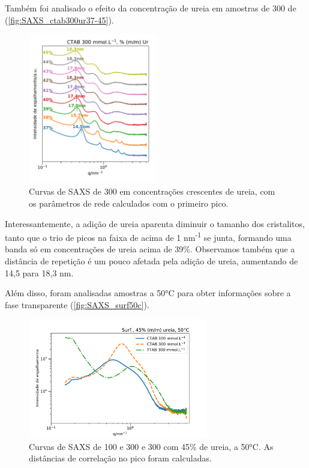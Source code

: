 	
	Também foi analisado o efeito da concentração de ureia em amostras de 300 \mM{} de \CTAB{} (\autoref{fig:SAXS_ctab300ur37-45}).
	
	\begin{figure}[h]
		\centering
		\includegraphics[width=0.5\textwidth]{imagens/saxs/CTAB300Ur37-45}
		\caption{Curvas de SAXS de \CTAB{} 300 \mM{} em concentrações crescentes de ureia, com os parâmetros de rede calculados com o primeiro pico.}
		\label{fig:SAXS_ctab300ur37-45}
	\end{figure}
	
	Interessantemente, a adição de ureia aparenta diminuir o tamanho dos cristalitos, tanto que o trio de picos na faixa de \q{} acima de 1 nm\textsuperscript{-1} se junta, formando uma banda só em concentrações de ureia acima de 39\%. Observamos também que a distância de repetição é um pouco afetada pela adição de ureia, aumentando de 14,5 para 18,3 nm.
	
	Além disso, foram analisadas amostras a 50°C para obter informações sobre a fase transparente (\autoref{fig:SAXS_surf50c}).
	
	\begin{figure}[h]
		\centering
		\includegraphics[width=0.7\textwidth]{imagens/saxs/Surf_50C}
		\caption{Curvas de SAXS de \CTAB{} 100 e 300 \mM{} e \TTAB{} 300 \mM{} com 45\% de ureia, a 50°C. As distâncias de correlação no pico foram calculadas.}
		\label{fig:SAXS_surf50c}
	\end{figure}

